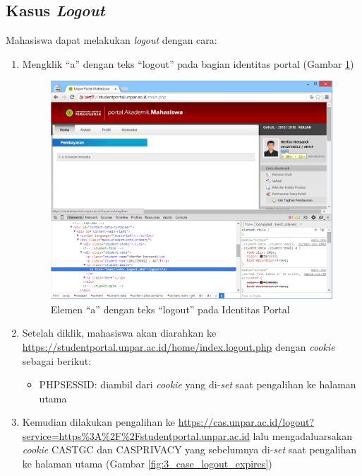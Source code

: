 \subsection{Kasus \textit{Logout}}
Mahasiswa dapat melakukan \textit{logout} dengan cara:
\begin{enumerate}
	\item Mengklik ``a'' dengan teks ``logout'' pada bagian identitas portal (Gambar \ref{fig:3_case_logout_link})
	\begin{figure}[H]
			\centering
			\includegraphics[scale=0.5]{Gambar/case-logout-link}
			\caption{Elemen ``a'' dengan teks ``logout'' pada Identitas Portal} 
			\label{fig:3_case_logout_link}
		\end{figure}
	\item Setelah diklik, mahasiswa akan diarahkan ke \url{https://studentportal.unpar.ac.id/home/index.logout.php} dengan \textit{cookie} sebagai berikut:
		\begin{itemize}
			\item PHPSESSID: diambil dari \textit{cookie} yang di-\textit{set} saat pengalihan ke halaman utama
		\end{itemize} 
	\item Kemudian dilakukan pengalihan ke \url{https://cas.unpar.ac.id/logout?service=https\%3A\%2F\%2Fstudentportal.unpar.ac.id} lalu mengadaluarsakan \textit{cookie} CASTGC dan CASPRIVACY yang sebelumnya di-\textit{set} saat pengalihan ke halaman utama (Gambar \ref{fig:3_case_logout_expires}) 
			\begin{figure}[H]
				\centering

\end{figure}
\end{enumerate}
